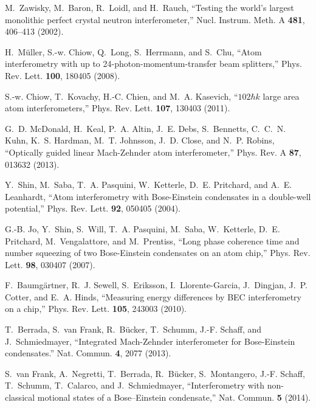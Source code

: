 \documentclass[%
 twocolumn,
 amsmath,amssymb,
 aps,
 pra,
]{revtex4-1}
\begin{document}
%
\begin{thebibliography}{10}
\newcommand{\enquote}[1]{``#1''}

M.~Zawisky, M.~Baron, R.~Loidl, and H.~Rauch, \enquote{{Testing the world's
  largest monolithic perfect crystal neutron interferometer},} Nucl. Instrum.
  Meth. A \textbf{481}, 406--413 (2002).

H.~M{\"u}ller, S.-w. Chiow, Q.~Long, S.~Herrmann, and S.~Chu, \enquote{{Atom
  interferometry with up to 24-photon-momentum-transfer beam splitters},} Phys.
  Rev. Lett. \textbf{100}, 180405 (2008).

S.-w. Chiow, T.~Kovachy, H.-C. Chien, and M.~A. Kasevich,
  \enquote{{$102\ensuremath{\hbar}k$ large area atom interferometers},} Phys.
  Rev. Lett. \textbf{107}, 130403 (2011).

G.~D. McDonald, H.~Keal, P.~A. Altin, J.~E. Debs, S.~Bennetts, C.~C.~N. Kuhn,
  K.~S. Hardman, M.~T. Johnsson, J.~D. Close, and N.~P. Robins,
  \enquote{{Optically guided linear Mach-Zehnder atom interferometer},} Phys.
  Rev. A \textbf{87}, 013632 (2013).

Y.~Shin, M.~Saba, T.~A. Pasquini, W.~Ketterle, D.~E. Pritchard, and A.~E.
  Leanhardt, \enquote{{Atom interferometry with Bose-Einstein condensates in a
  double-well potential},} Phys. Rev. Lett. \textbf{92}, 050405 (2004).

G.-B. Jo, Y.~Shin, S.~Will, T.~A. Pasquini, M.~Saba, W.~Ketterle, D.~E.
  Pritchard, M.~Vengalattore, and M.~Prentiss, \enquote{{Long phase coherence
  time and number squeezing of two Bose-Einstein condensates on an atom chip},}
  Phys. Rev. Lett. \textbf{98}, 030407 (2007).

F.~Baumg{\"a}rtner, R.~J. Sewell, S.~Eriksson, I.~Llorente-Garcia, J.~Dingjan,
  J.~P. Cotter, and E.~A. Hinds, \enquote{{Measuring energy differences by BEC
  interferometry on a chip},} Phys. Rev. Lett. \textbf{105}, 243003 (2010).

T.~Berrada, S.~van Frank, R.~B{\"u}cker, T.~Schumm, J.-F. Schaff, and
  J.~Schmiedmayer, \enquote{{Integrated Mach-Zehnder interferometer for
  Bose-Einstein condensates.}} {Nat. Commun.} \textbf{4}, 2077 (2013).

S.~van Frank, A.~Negretti, T.~Berrada, R.~B{\"u}cker, S.~Montangero, J.-F.
  Schaff, T.~Schumm, T.~Calarco, and J.~Schmiedmayer, \enquote{{Interferometry
  with non-classical motional states of a Bose--Einstein condensate},} Nat.
  Commun. \textbf{5} (2014).


\end{thebibliography}
\end{document}
